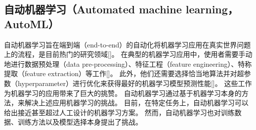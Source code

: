 


\subsection{自动机器学习（Automated machine learning，AutoML）}

自动机器学习旨在端到端（end-to-end）的自动化将机器学习应用在真实世界问题上的流程，是目前热门的研究领域[]。
在典型的机器学习应用中，使用者需要手动地进行数据预处理（data pre-processing）、特征工程（feature engineering）、特称提取（feature extraction）等工作[]。
此外，他们还需要选择恰当地算法并对超参数（hyperparameter）进行优化来获得最好的机器学习模型预测性能[]。
这些工作为机器学习的应用带来了巨大的挑赞。
自动机器学习通过基于机器学习本身的方法，来解决上述应用机器学习的挑战。
目前，在特定任务上，自动机器学习可以给出接近甚至超过人工设计的机器学习方案。
然而，自动机器学习也对训练数据、训练方法以及模型选择本身提出了挑战。



